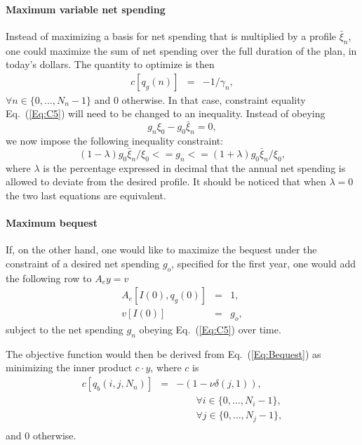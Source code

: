 \documentclass{report}[fleqn,12pt]
\begin{document}
\paragraph*{Maximum variable net spending}
Instead of maximizing a basis for net spending that is multiplied by a profile $\bar{\xi}_n$,
one could maximize the sum of net spending over the full duration
of the plan, in today's dollars. The quantity to optimize is then
\begin{eqnarray}
	c[q_g(n)] &=& -1/\gamma_n,
\end{eqnarray}
$\forall n \in \{0, \ldots, N_n-1\}$ and 0 otherwise.
In that case, constraint equality Eq.~(\ref{Eq:C5}) will need to be changed to an inequality. 
Instead of obeying 
\begin{equation}
	g_n \xi_0 - g_0 \bar{\xi}_n = 0,
\end{equation}
we now impose the following inequality constraint:
\begin{equation}
        \label{Eq:C15}
	(1 - \lambda) g_0 \bar{\xi}_n/\xi_0 <= g_n <= (1 + \lambda) g_0 \bar{\xi}_n/\xi_0 ,
\end{equation}
where $\lambda$ is the percentage expressed in decimal that the annual net spending is allowed to deviate
from the desired profile. It should be noticed that when $\lambda = 0$ the two
last equations are equivalent.

\paragraph*{Maximum bequest}
If, on the other hand, one would like to maximize the bequest under the constraint of a desired
net spending $g_o$, specified for the first year,
one would add the following row to $A_ey = v$
\begin{eqnarray}
	\label{Eq:FixedIncome}
	A_e[I(0), q_g(0)] &=& 1, \nonumber \\
	v[I(0)] &=& g_o,
\end{eqnarray}
subject to the net spending $g_n$ obeying Eq.~(\ref{Eq:C5}) over time.

The objective function would then be derived from Eq.~(\ref{Eq:Bequest}) as
minimizing the inner product $c\cdot y$, where $c$ is
\begin{eqnarray}
	\label{Eq:MaxBequest}
	c[q_b(i, j, N_n)] &=& -(1 - \nu\delta(j, 1)),\\
	&&\qquad\forall i \in \{0,\ldots, N_i-1\},\nonumber\\
	&&\qquad\forall j \in \{0,\ldots, N_j-1\},\nonumber\\
\end{eqnarray}
and 0 otherwise.
\end{document}
